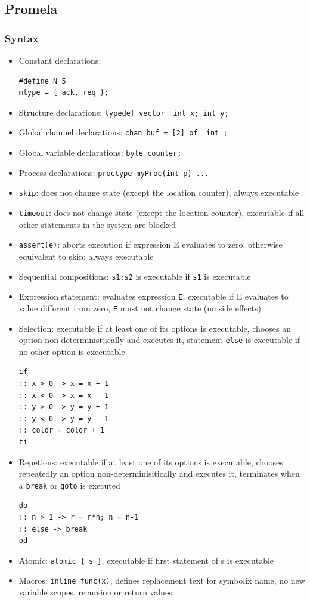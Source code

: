 \documentclass{article}
\begin{document}
\subsection{Promela}
\subsubsection{Syntax}
\begin{itemize}
    \item Constant declarations: 
    \begin{verbatim}
#define N 5
mtype = { ack, req };
    \end{verbatim}
    \item Structure declarations: \texttt{typedef vector { int x; int y};}
    \item Global channel declarations: \texttt{chan buf = [2] of { int };}
    \item Global variable declarations: \texttt{byte counter;}
    \item Process declarations: \texttt{proctype myProc(int p) {...}}
    \item \texttt{skip}: does not change state (except the location counter), always executable
    \item \texttt{timeout}: does not change state (except the location counter), executable if all other statements in the system are blocked
    \item \texttt{assert(e)}: aborts execution if expression E evaluates to zero, otherwise equivalent to skip; always executable
    \item Sequential compositions: \texttt{s1;s2} is executable if \texttt{s1} is executable
    \item Expression statement: evaluates expression \texttt{E}, executable if E evaluates to value different from zero,
    \texttt{E} must not change state (no side effects)
    \item Selection: executable if at least one of its options is executable, chooses an option non-determinisitically and executes it, 
    statement \texttt{else} is executable if no other option is executable
\begin{verbatim}
if
:: x > 0 -> x = x + 1
:: x < 0 -> x = x - 1
:: y > 0 -> y = y + 1
:: y < 0 -> y = y - 1
:: color = color + 1
fi
\end{verbatim}
    \item Repetions: executable if at least one of its options is executable, chooses repeatedly an option non-determinisitically and executes it, 
    terminates when a \texttt{break} or \texttt{goto} is executed
\begin{verbatim}
do
:: n > 1 -> r = r*n; n = n-1
:: else -> break
od
\end{verbatim}
    \item Atomic: \texttt{atomic \{ s \}}, executable if first statement of s is executable
    \item Macros: \texttt{inline func(x){}}, defines replacement text for symbolix name, no new variable scopes, recursion or return values
\end{itemize}
\end{document}
